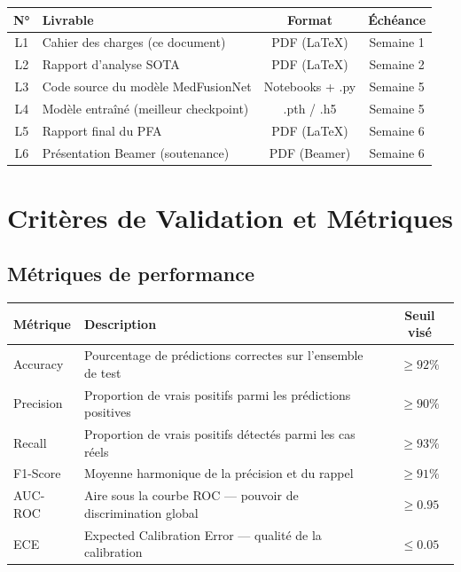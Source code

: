 \documentclass[a4paper,12pt]{article}
\begin{document}
\renewcommand{\arraystretch}{1.35}
\begin{tabularx}{\linewidth}{@{}c X c c@{}}
  \toprule
  \textbf{N°} & \textbf{Livrable} & \textbf{Format} & \textbf{Échéance} \\
  \midrule
  L1 & Cahier des charges (ce document) & PDF (\LaTeX) & Semaine 1 \\
  \rowcolor{grisClair}
  L2 & Rapport d'analyse SOTA & PDF (\LaTeX) & Semaine 2 \\
  L3 & Code source du modèle MedFusionNet & Notebooks + .py & Semaine 5 \\
  \rowcolor{grisClair}
  L4 & Modèle entraîné (meilleur checkpoint) & .pth / .h5 & Semaine 5 \\
  L5 & Rapport final du PFA & PDF (\LaTeX) & Semaine 6 \\
  \rowcolor{grisClair}
  L6 & Présentation Beamer (soutenance) & PDF (Beamer) & Semaine 6 \\
  \bottomrule
\end{tabularx}

\newpage
\section{Critères de Validation et Métriques}

\subsection{Métriques de performance}

\renewcommand{\arraystretch}{1.4}
\begin{tabularx}{\linewidth}{@{}l X c@{}}
  \toprule
  \textbf{Métrique} & \textbf{Description} & \textbf{Seuil visé} \\
  \midrule
  Accuracy & Pourcentage de prédictions correctes sur l'ensemble de test & $\geq 92\%$ \\
  \rowcolor{grisClair}
  Precision & Proportion de vrais positifs parmi les prédictions positives & $\geq 90\%$ \\
  Recall & Proportion de vrais positifs détectés parmi les cas réels & $\geq 93\%$ \\
  \rowcolor{grisClair}
  F1-Score & Moyenne harmonique de la précision et du rappel & $\geq 91\%$ \\
  AUC-ROC & Aire sous la courbe ROC — pouvoir de discrimination global & $\geq 0.95$ \\
  \rowcolor{grisClair}
  ECE & Expected Calibration Error — qualité de la calibration & $\leq 0.05$ \\
  \bottomrule
\end{tabularx}
\end{document}
